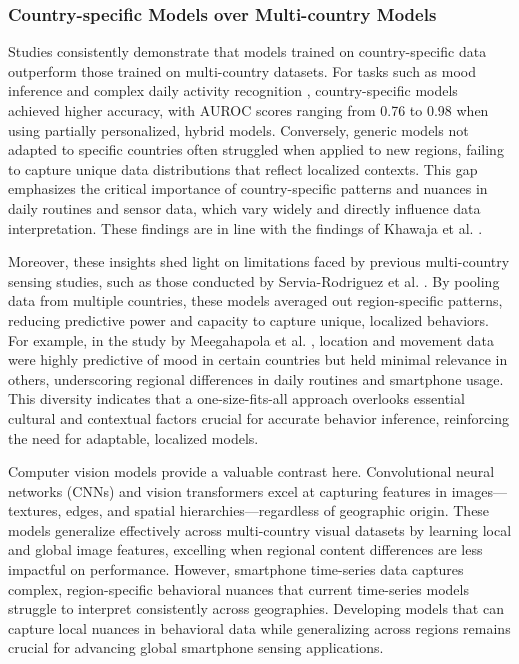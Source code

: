 \subsubsection{Country-specific Models over Multi-country Models}


Studies consistently demonstrate that models trained on country-specific data outperform those trained on multi-country datasets. For tasks such as mood inference \cite{meegahapola2023generalization} and complex daily activity recognition \cite{assi2023complex}, country-specific models achieved higher accuracy, with AUROC scores ranging from 0.76 to 0.98 when using partially personalized, hybrid models. Conversely, generic models not adapted to specific countries often struggled when applied to new regions, failing to capture unique data distributions that reflect localized contexts. This gap emphasizes the critical importance of country-specific patterns and nuances in daily routines and sensor data, which vary widely and directly influence data interpretation. These findings are in line with the findings of Khawaja et al. \cite{khwaja2019modeling}. 

Moreover, these insights shed light on limitations faced by previous multi-country sensing studies, such as those conducted by Servia-Rodriguez et al. \cite{servia2017mobile}. By pooling data from multiple countries, these models averaged out region-specific patterns, reducing predictive power and capacity to capture unique, localized behaviors. For example, in the study by Meegahapola et al. \cite{meegahapola2023generalization}, location and movement data were highly predictive of mood in certain countries but held minimal relevance in others, underscoring regional differences in daily routines and smartphone usage. This diversity indicates that a one-size-fits-all approach overlooks essential cultural and contextual factors crucial for accurate behavior inference, reinforcing the need for adaptable, localized models.

Computer vision models provide a valuable contrast here. Convolutional neural networks (CNNs) and vision transformers excel at capturing features in images—textures, edges, and spatial hierarchies—regardless of geographic origin. These models generalize effectively across multi-country visual datasets by learning local and global image features, excelling when regional content differences are less impactful on performance. However, smartphone time-series data captures complex, region-specific behavioral nuances that current time-series models struggle to interpret consistently across geographies. Developing models that can capture local nuances in behavioral data while generalizing across regions remains crucial for advancing global smartphone sensing applications.


